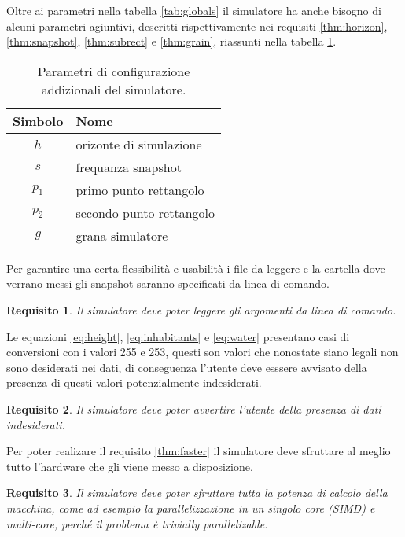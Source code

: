 \documentclass[draft]{article}
\newcommand{\eng}[1]{\foreignlanguage{english}{#1}} %
\newtheorem{requirement}{Requisito}
\begin{document}
Oltre ai parametri nella tabella \ref{tab:globals} il simulatore ha anche
bisogno di alcuni parametri agiuntivi, descritti rispettivamente nei requisiti
\ref{thm:horizon}, \ref{thm:snapshot}, \ref{thm:subrect} e \ref{thm:grain},
riassunti nella tabella \ref{tab:config}.

\begin{table}
\centering
\begin{tabular}{|c|l|}
	\hline
	\textbf{Simbolo} & \textbf{Nome}\\
	\hline
	$h$ & orizonte di simulazione\\
	$s$ & frequanza \eng{snapshot}\\
	$p_1$ & primo punto rettangolo\\
	$p_2$ & secondo punto rettangolo\\
	$g$ & grana simulatore\\
	\hline
\end{tabular}
\caption{Parametri di configurazione addizionali del simulatore.}
\label{tab:config}
\end{table}

Per garantire una certa flessibilità e usabilità i file da leggere e la cartella
dove verrano messi gli \eng{snapshot} saranno specificati da linea di comando.

\begin{requirement}
Il simulatore deve poter leggere gli argomenti da linea di comando.
\end{requirement}

Le equazioni \ref{eq:height}, \ref{eq:inhabitants} e \ref{eq:water} presentano
casi di conversioni con i valori 255 e 253, questi son valori che nonostate
siano legali non sono desiderati nei dati, di conseguenza l'utente deve esssere
avvisato della presenza di questi valori potenzialmente indesiderati.

\begin{requirement}
Il simulatore deve poter avvertire l'utente della presenza di dati indesiderati.
\end{requirement}

Per poter realizare il requisito \ref{thm:faster} il simulatore deve sfruttare
al meglio tutto l'\eng{hardware} che gli viene messo a disposizione.

\begin{requirement}\label{thm:multicore}
Il simulatore deve poter sfruttare tutta la potenza di calcolo della macchina,
come ad esempio la parallelizzazione in un singolo \eng{core} (SIMD) e
\eng{multi-core}, perché il problema è \eng{trivially parallelizable}.
\end{requirement}
\end{document}
